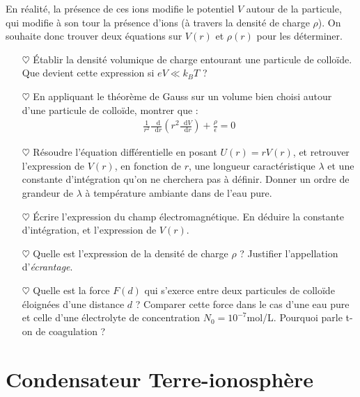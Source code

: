 \documentclass{report}
\newcommand*\dif{\mathop{}\!\mathrm{d}}
\begin{document}
En réalité, la présence de ces ions modifie le potentiel $V$ autour de la particule, qui modifie à son tour la présence d'ions (à travers la densité de charge $\rho$). On souhaite donc trouver deux équations sur $V(r)$ et $\rho(r)$ pour les déterminer. 

\begin{itemize}

	\item[$\heartsuit$] Établir la densité volumique de charge entourant une particule de colloïde. Que devient cette expression si $eV\ll k_BT$ ?
	
	\item[$\heartsuit$] En appliquant le théorème de Gauss sur un volume bien choisi autour d'une particule de colloïde, montrer que : 
	\begin{align*}
		\frac{1}{r^2}\frac{\dif}{\dif r}\left( r^2\frac{\dif V}{\dif r}\right) +\frac{\rho}{\epsilon}=0
	\end{align*}

	\item[$\heartsuit$] Résoudre l'équation différentielle en posant $U(r)=rV(r)$, et retrouver l'expression de $V(r)$, en fonction de $r$, une longueur caractéristique $\lambda$ et une constante d'intégration qu'on ne cherchera pas à définir. Donner un ordre de grandeur de $\lambda$ à température ambiante dans de l'eau pure.
	
	\item[$\heartsuit$] Écrire l'expression du champ électromagnétique. En déduire la constante d'intégration, et l'expression de $V(r)$. 
	
	\item[$\heartsuit$] Quelle est l'expression de la densité de charge $\rho$ ? Justifier l'appellation d'\textit{écrantage}.
	
	\item[$\heartsuit$] Quelle est la force $F(d)$ qui s'exerce entre deux particules de colloïde éloignées d'une distance $d$ ? Comparer cette force dans le cas d'une eau pure et celle d'une électrolyte de concentration $N_0=10^{-7}$mol/L. Pourquoi parle t-on de coagulation ?

\end{itemize} 

\newpage

\section*{Condensateur Terre-ionosphère}
\end{document}
